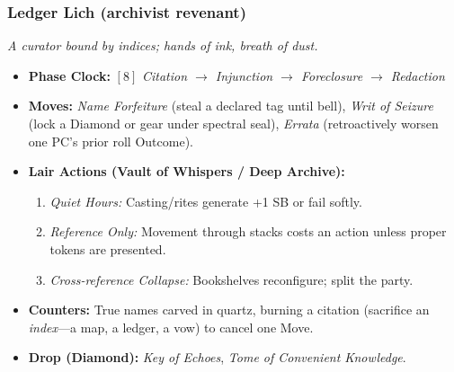 \subsubsection*{Ledger Lich (archivist revenant)}
\textit{A curator bound by indices; hands of ink, breath of dust.}
\begin{itemize}
  \item \textbf{Phase Clock:} \([8]\) \emph{Citation \(\rightarrow\) Injunction \(\rightarrow\) Foreclosure \(\rightarrow\) Redaction}
  \item \textbf{Moves:} \emph{Name Forfeiture} (steal a declared tag until bell), \emph{Writ of Seizure} (lock a Diamond or gear under spectral seal), \emph{Errata} (retroactively worsen one PC’s prior roll Outcome).
  \item \textbf{Lair Actions (Vault of Whispers / Deep Archive):}
  \begin{enumerate}\item \emph{Quiet Hours:} Casting/rites generate +1 SB or fail softly.\item \emph{Reference Only:} Movement through stacks costs an action unless proper tokens are presented.\item \emph{Cross-reference Collapse:} Bookshelves reconfigure; split the party. \end{enumerate}
  \item \textbf{Counters:} True names carved in quartz, burning a citation (sacrifice an \emph{index}—a map, a ledger, a vow) to cancel one Move.
  \item \textbf{Drop (Diamond):} \emph{Key of Echoes}, \emph{Tome of Convenient Knowledge}.
\end{itemize}

